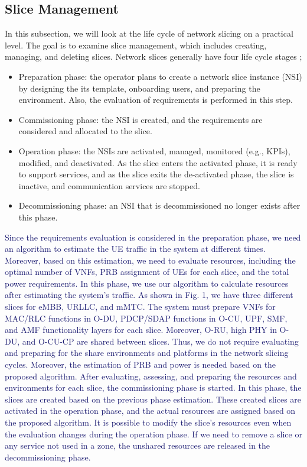 \documentclass[lettersize,journal]{IEEEtran}
\begin{document}
\subsection{Slice Management}
In this subsection, we will look at the life cycle of network slicing on a practical level. 
The goal is to examine slice management, which includes creating, managing, and deleting slices. Network slices generally have four life cycle stages \cite{ETSI2};
\begin{itemize}
\item Preparation phase: the operator plans to create a network slice instance (NSI) by designing the its template, onboarding users, and preparing the environment. Also, the evaluation of requirements is performed in this step.
\item Commissioning phase: the NSI is created, and the requirements are considered and allocated to the slice.
\item Operation phase: the NSIs are activated, managed, monitored (e.g., KPIs), modified, and deactivated. As the slice enters the activated phase, it is ready to support services, and as the slice exits the de-activated phase, the slice is inactive, and communication services are stopped.
\item Decommissioning phase: an NSI that is decommissioned no longer exists after this phase.
\end{itemize}
\textcolor{MidnightBlue}{Since the requirements evaluation is considered in the preparation phase, we need an algorithm to estimate the UE traffic in the system at different times. Moreover, based on this estimation, we need to evaluate resources, including the optimal number of VNFs, PRB assignment of UEs for each slice, and the total power requirements. In this phase, we use our algorithm to calculate resources after estimating the system's traffic.
As shown in Fig. 1, we have three different slices for eMBB, URLLC, and mMTC. The system must prepare VNFs for MAC/RLC functions in O-DU, PDCP/SDAP functions in O-CU, UPF, SMF, and AMF functionality layers for each slice. Moreover, O-RU, high PHY in O-DU, and O-CU-CP are shared between slices. Thus, we do not require evaluating and preparing for the share environments and platforms in the network slicing cycles. Moreover, the estimation of PRB and power is needed based on the proposed algorithm. 
After evaluating, assessing, and preparing the resources and environments for each slice, the commissioning phase is started. In this phase, the slices are created based on the previous phase estimation. These created slices are activated in the operation phase, and the actual resources are assigned based on the proposed algorithm.
It is possible to modify the slice's resources even when the evaluation changes during the operation phase. 
If we need to remove a slice or any service not used in a zone, the unshared resources are released in the decommissioning phase.}
\end{document}
